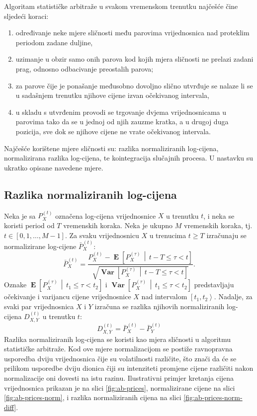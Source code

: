 \documentclass[lmodern, utf8, diplomski, numeric]{fer}
\newcommand{\Efromto}[2]{\operatorname{\mathbf{E}}\q[#1\, \middle\vert\, #2\w]}
\newcommand{\Varfromto}[2]{\operatorname{\mathbf{Var}}\q[#1\, \middle\vert\, #2\w]}
\newcommand{\norm}[1]{\bar{#1}}
\newcommand{\q}{\left}
\newcommand{\w}{\right}
\begin{document}
  Algoritam statističke arbitraže u svakom vremenskom trenutku najčešće čine sljedeći koraci:
  \begin{enumerate}
    \item određivanje neke mjere sličnosti među parovima vrijednosnica nad proteklim periodom zadane duljine,
    \item uzimanje u obzir samo onih parova kod kojih mjera sličnosti ne prelazi zadani prag, odnosno odbacivanje preostalih parova;
    \item za parove čije je ponašanje međusobno dovoljno slično utvrđuje se nalaze li se u sadašnjem trenutku njihove cijene izvan očekivanog intervala,
    \item u skladu s utvrđenim provodi se trgovanje dvjema vrijednosnicama u parovima tako da se u jednoj od njih zauzme kratka, a u drugoj duga pozicija, sve dok se njihove cijene ne vrate očekivanog intervala.
  \end{enumerate}
  
  Najčešće korištene mjere sličnosti su: razlika normaliziranih log-cijena, normalizirana razlika log-cijena, te kointegracija slučajnih procesa.
  U nastavku su ukratko opisane navedene mjere.
  
  \subsection{Razlika normaliziranih log-cijena}
  Neka je sa $P_X^{\q(t\w)}$ označena log-cijena vrijednosnice $X$ u trenutku $t$, i neka se koristi period od $T$ vremenskih koraka.
  Neka je ukupno $M$ vremenskih koraka, tj. $t \in \q[0, 1, \ldots, M - 1\w]$.
  Za svaku vrijednosnicu $X$ u trenucima $t \ge T$ izračunaju se normalizirane log-cijene $\norm{P}_X^{\q(t\w)}$:
  \begin{equation}
  \norm{P}_X^{\q(t\w)} = \frac{P_X^{\q(t\w)} - \Efromto{P_X^{(\tau)}}{t-T \le \tau < t}}{\sqrt{\Varfromto{P_X^{(\tau)}}{t-T \le \tau < t}}}.
  \end{equation}
  Oznake $\Efromto{P_X^{(\tau)}}{t_1 \le \tau < t_2}$ i $\Varfromto{P_X^{(\tau)}}{t_1 \le \tau < t_2}$ predstavljaju očekivanje i varijancu cijene vrijednosnice $X$ nad intervalom $\q[t_1, t_2\w\rangle$.
  Nadalje, za svaki par vrijednosnica $X$ i $Y$ izračuna se razlika njihovih normaliziranih log-cijena $D_{X,Y}^{\q(t\w)}$ u trenutku $t$:
  \begin{equation}
  D_{X,Y}^{\q(t\w)} = \norm{P}_X^{\q(t\w)} - \norm{P}_Y^{\q(t\w)}
  \end{equation}
  Razlika normaliziranih log-cijena se koristi kao mjera sličnosti u algoritmu statističke arbitraže.
  Kod ove mjere normalizacijom se postiže ravnopravna usporedba dviju vrijednosnica čije su volatilnosti različite, što znači da će se prilikom usporedbe dviju dionica čiji su intenziteti promjene cijene različiti nakon normalizacije oni dovesti na istu razinu.
  Ilustrativni primjer kretanja cijena vrijednosnica prikazan je na slici \ref{fig:ab-prices}, normalizirane cijene na slici \ref{fig:ab-prices-norm}, i razlika normaliziranih cijena na slici \ref{fig:ab-prices-norm-diff}.
  
\end{document}

